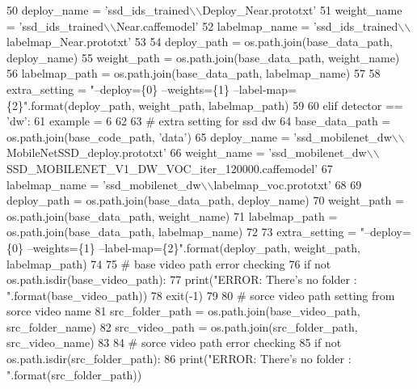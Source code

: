 \begin{DoxyCode}
50         deploy\_name = \textcolor{stringliteral}{'ssd\_ids\_trained\(\backslash\)\(\backslash\)Deploy\_Near.prototxt'}
51         weight\_name = \textcolor{stringliteral}{'ssd\_ids\_trained\(\backslash\)\(\backslash\)Near.caffemodel'}
52         labelmap\_name = \textcolor{stringliteral}{'ssd\_ids\_trained\(\backslash\)\(\backslash\)labelmap\_Near.prototxt'}
53 
54         deploy\_path = os.path.join(base\_data\_path, deploy\_name)
55         weight\_path = os.path.join(base\_data\_path, weight\_name)
56         labelmap\_path = os.path.join(base\_data\_path, labelmap\_name)
57 
58         extra\_setting = \textcolor{stringliteral}{"--deploy=\{0\} --weights=\{1\} --label-map=\{2\}"}.format(deploy\_path, weight\_path, 
      labelmap\_path)
59 
60     \textcolor{keywordflow}{elif} detector == \textcolor{stringliteral}{'dw'}:
61         example = 6
62 
63         \textcolor{comment}{# extra setting for ssd dw}
64         base\_data\_path = os.path.join(base\_code\_path, \textcolor{stringliteral}{'data'})
65         deploy\_name = \textcolor{stringliteral}{'ssd\_mobilenet\_dw\(\backslash\)\(\backslash\)MobileNetSSD\_deploy.prototxt'}
66         weight\_name = \textcolor{stringliteral}{'ssd\_mobilenet\_dw\(\backslash\)\(\backslash\)SSD\_MOBILENET\_V1\_DW\_VOC\_iter\_120000.caffemodel'}
67         labelmap\_name = \textcolor{stringliteral}{'ssd\_mobilenet\_dw\(\backslash\)\(\backslash\)labelmap\_voc.prototxt'}
68 
69         deploy\_path = os.path.join(base\_data\_path, deploy\_name)
70         weight\_path = os.path.join(base\_data\_path, weight\_name)
71         labelmap\_path = os.path.join(base\_data\_path, labelmap\_name)
72 
73         extra\_setting = \textcolor{stringliteral}{"--deploy=\{0\} --weights=\{1\} --label-map=\{2\}"}.format(deploy\_path, weight\_path, 
      labelmap\_path)
74 
75     \textcolor{comment}{# base video path error checking}
76     \textcolor{keywordflow}{if} \textcolor{keywordflow}{not} os.path.isdir(base\_video\_path):
77         print(\textcolor{stringliteral}{"ERROR: There's no folder : "}.format(base\_video\_path))
78         exit(-1)
79 
80     \textcolor{comment}{# sorce video path setting from sorce video name}
81     src\_folder\_path = os.path.join(base\_video\_path, src\_folder\_name)
82     src\_video\_path = os.path.join(src\_folder\_path, src\_video\_name)
83 
84     \textcolor{comment}{# sorce video path error checking}
85     \textcolor{keywordflow}{if} \textcolor{keywordflow}{not} os.path.isdir(src\_folder\_path):
86         print(\textcolor{stringliteral}{"ERROR: There's no folder : "}.format(src\_folder\_path))

\end{DoxyCode}
